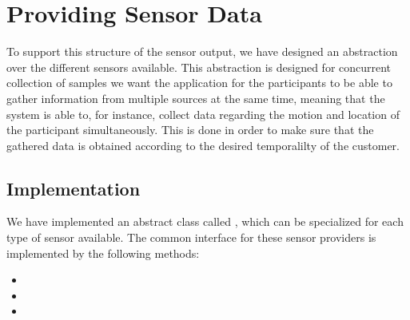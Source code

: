 \section{Providing Sensor Data}
\label{sec:providing_sensor_data}

To support this structure of the sensor output, we have designed an abstraction over the different sensors available. This abstraction is designed for concurrent collection of samples we want the application for the participants to be able to gather information from multiple sources at the same time, meaning that the system is able to, for instance, collect data regarding the motion and location of the participant simultaneously. This is done in order to make sure that the gathered data is obtained according to the desired temporalilty of the customer.

\subsection{Implementation}
We have implemented an abstract class called , which can be specialized for each type of sensor available. The common interface for these sensor providers is implemented by the following methods:

\begin{itemize}
	\item {}
	\item {}
	\item {}
\end{itemize}

